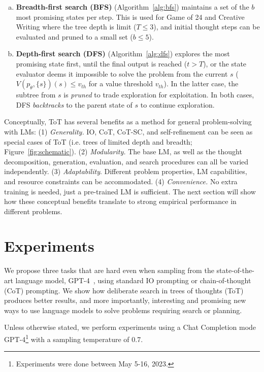 \begin{enumerate}[(a)]
\item 
\textbf{Breadth-first search (BFS)} (Algorithm~\ref{alg:bfs}) maintains a set of the $b$ most promising states per step. This is used for Game of 24 and Creative Writing where the tree depth is limit ($T \le 3$), and initial thought steps can be evaluated and pruned to a small set ($b \le 5$). 

\item 
\textbf{Depth-first search (DFS)} (Algorithm~\ref{alg:dfs}) explores the most promising state first, until the final output is reached ($t > T$), or the state evaluator deems it impossible to solve the problem from the current $s$ ($V(p_\theta, \{s\})(s) \le v_{th}$ for a value threshold $v_{th}$). In the latter case, the subtree from $s$ is {\em pruned} to trade exploration for exploitation. In both cases, DFS {\em backtracks} to the parent state of $s$ to continue exploration. 

\end{enumerate}

Conceptually, ToT has several benefits as a method for general problem-solving with LMs: (1) {\em Generality.} IO, CoT, CoT-SC, and self-refinement can be seen as special cases of ToT (i.e. trees of limited depth and breadth; Figure~\ref{fig:schematic}). (2) {\em Modularity.}  The base LM, as well as the  thought decomposition, generation, evaluation, and search procedures can all be varied independently. (3) {\em Adaptability}. Different problem properties, LM capabilities, and resource constraints can be accommodated.  (4) {\em Convenience.} No extra training is needed, just a pre-trained LM is sufficient. The next section will show how these conceptual benefits translate to strong empirical performance in different problems. 

\section{Experiments}

We propose three tasks that are hard even when sampling from the state-of-the-art language model, GPT-4~\citep{OpenAI2023GPT4TR}, using standard IO prompting or chain-of-thought (CoT) prompting. We show how deliberate search in trees of thoughts (ToT) produces better results, and more importantly, interesting and promising new ways to use language models to solve problems requiring search or planning. 

Unless otherwise stated, we perform experiments using a Chat Completion mode GPT-4\footnote{Experiments were done between May 5-16, 2023.} with a sampling temperature of 0.7. 


